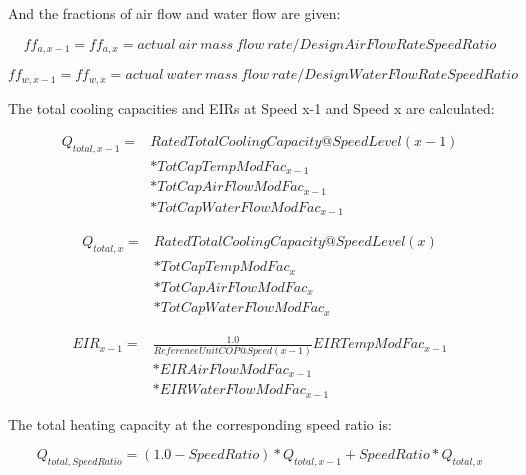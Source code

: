 And the fractions of air flow and water flow are given:

\begin{equation}
ff_{a,x-1} = ff_{a,x} = actual~air~mass~flow~rate/DesignAirFlowRateSpeedRatio
\end{equation}

\begin{equation}
ff_{w,x-1} = ff_{w,x} = actual~water~mass~flow~rate/DesignWaterFlowRateSpeedRatio
\end{equation}

The total cooling capacities and EIRs at Speed x-1 and Speed x are calculated:

\begin{equation}
  \begin{array}{rl}
    {Q_{total,x - 1}} =& RatedTotalCoolingCapacity@SpeedLevel\left( {x - 1} \right) \\
                      &* TotCapTempModFac_{x - 1} \\
                      &* TotCapAirFlowModFac_{x - 1} \\
                      &* TotCapWaterFlowModFac_{x - 1}
  \end{array}
\end{equation}

\begin{equation}
  \begin{array}{rl}
    {Q_{total,x}} =& RatedTotalCoolingCapacity@SpeedLevel\left( x \right) \\
                  &* TotCapTempModFac_x \\
                  &* TotCapAirFlowModFac_x \\
                  &* TotCapWaterFlowModFac_x
  \end{array}
\end{equation}

\begin{equation}
  \begin{array}{rl}
    EIR_{x - 1} =& \frac{{1.0}}{{ReferenceUnitCOP@Speed(x - 1)}}EIRTempModFac_{x - 1} \\
                &* EIRAirFlowModFac_{x - 1} \\
                &* EIRWaterFlowModFac_{x - 1}
  \end{array}
\end{equation}

The total heating capacity at the corresponding speed ratio is:

\begin{equation}
{Q_{total,SpeedRatio}} = \left( {1.0 - SpeedRatio} \right)*{Q_{total,x - 1}} + SpeedRatio*{Q_{total,x}}
\end{equation}

